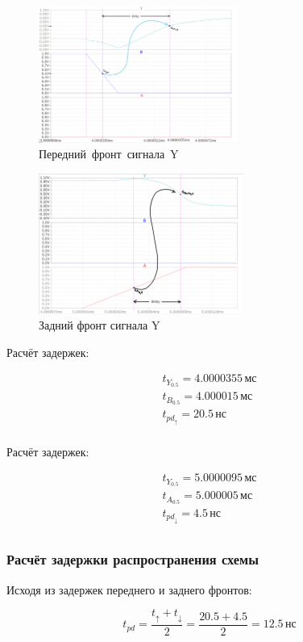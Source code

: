 \setlength{\columnsep}{2.5cm}

\begin{multicols}{2}

	\begin{figure}[H]
		\centering
		\includegraphics[width=0.58\textwidth]{../data/nor_front_delay.png}
		\captionsetup{width=1\textwidth}
		\centering
		\caption{Передний~фронт~сигнала~Y}
	\end{figure}

	\begin{figure}[H]
		\centering
		\includegraphics[width=0.6\textwidth]{../data/nor_back_delay.png}
		\caption{Задний фронт сигнала Y}
	\end{figure}

	\columnbreak

	\centering
	\vspace*{0.9cm}
	Расчёт задержек:

	\vspace*{-0.3cm}
	\[
		\begin{gathered}
			t_{Y_{0.5}} = 4.0000355 \, \text{мс} \\
			t_{B_{0.5}} = 4.000015 \, \text{мс} \\
			t_{pd_\uparrow} = 20.5 \, \text{нс} \\
		\end{gathered}
	\]

	\vspace*{5cm}
	Расчёт задержек:

	\vspace*{-0.3cm}
	\[
		\begin{gathered}
			t_{Y_{0.5}} = 5.0000095 \, \text{мс} \\
			t_{A_{0.5}} = 5.000005 \, \text{мс} \\
			t_{pd_\downarrow} = 4.5 \, \text{нс} \\
		\end{gathered}
	\]
\end{multicols}

\subsubsection{Расчёт задержки распространения схемы}
Исходя из задержек переднего и заднего фронтов:

\[
	t_{pd} = \frac{t_\uparrow + t_\downarrow}{2} = \frac{20.5+4.5}{2} = 12.5 \, \text{нс}
\]
